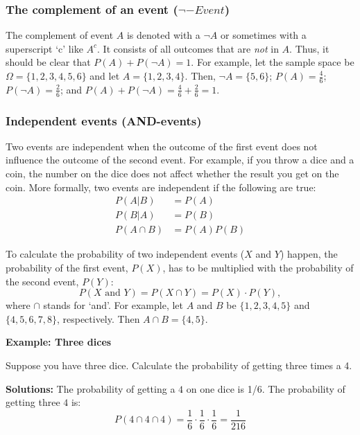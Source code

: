 \documentclass[
  12pt,
  oneside]{book}
\theoremstyle{definition}
\theoremstyle{definition}
\theoremstyle{definition}
\theoremstyle{definition}
\theoremstyle{remark}
\begin{document}
\subsubsection{\texorpdfstring{The complement of an event (\(\neg-Event\))}{The complement of an event (\textbackslash neg-Event)}}\label{the-complement-of-an-event-neg-event}

The complement of event \(A\) is denoted with a \(\neg A\) or sometimes with a superscript `c' like \(A^c\).
It consists of all outcomes that are \emph{not} in \(A\). Thus, it should be clear that \(P(A) + P(\neg A) = 1\).
For example, let the sample space be \(\Omega = \{1, 2, 3, 4, 5, 6\}\) and let \(A = \{1, 2, 3, 4\}\).
Then, \(\neg A = \{5, 6\}\); \(P(A) = \frac{4}{6}\); \(P(\neg A) = \frac{2}{6}\); and \(P(A) + P(\neg A) = \frac{4}{6}+\frac{2}{6} = 1\).

\subsubsection{Independent events (AND-events)}\label{independent-events-and-events}

Two events are independent when the outcome of the first event does not influence the outcome of the second event.
For example, if you throw a dice and a coin, the number on the dice does not affect whether the result you get on the coin.
More formally, two events are independent if the following are true:
\begin{align*}
    P(A|B) &= P(A)\\
    P(B|A) &= P(B)\\
    P(A \cap B) &= P(A)P(B)
\end{align*}

To calculate the probability of two independent events (\(X\) and \(Y\)) happen, the probability of the first event, \(P(X)\), has to be multiplied with the probability of the second event, \(P(Y)\):
\[ P(X \text{ and } Y)=P(X \cap Y)=P(X)\cdot P(Y),\]
where \(\cap\) stands for `and'.
For example, let \(A\) and \(B\) be \(\{1, 2, 3, 4, 5\}\) and \(\{4, 5, 6, 7, 8\}\), respectively. Then \(A \cap B = \{4, 5\}\).

\textbf{Example: Three dices}

Suppose you have three dice. Calculate the probability of getting three times a 4.

\textbf{Solutions:}
The probability of getting a \(4\) on one dice is 1/6. The probability of getting three \(4\) is:
\[
P(4 \cap 4 \cap 4) = \frac{1}{6}\cdot \frac{1}{6}\cdot \frac{1}{6}= \frac{1}{216}
\]
\end{document}
